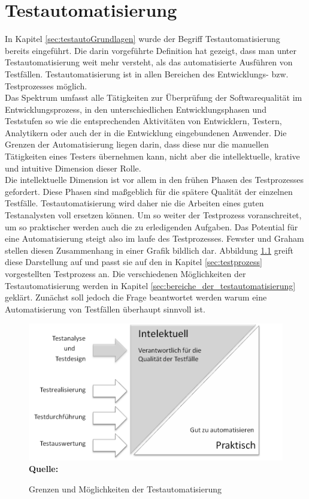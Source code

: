 \chapter{Testautomatisierung}
\label{sec:testautomatisierung}
In Kapitel \ref{sec:testautoGrundlagen} wurde der Begriff Testautomatisierung bereits eingeführt. Die darin vorgeführte Definition hat gezeigt, dass man unter Testautomatisierung weit mehr versteht, als das automatisierte Ausführen von Testfällen.
Testautomatisierung ist in allen Bereichen des Entwicklungs- bzw. Testprozesses möglich.\\
\glqq Das Spektrum umfasst alle Tätigkeiten zur Überprüfung der Softwarequalität im Entwicklungsprozess, in den unterschiedlichen Entwicklungsphasen und Teststufen so wie die entsprechenden Aktivitäten von Entwicklern, Testern, Analytikern oder auch der in die Entwicklung eingebundenen Anwender. Die Grenzen der Automatisierung liegen darin, dass diese nur die manuellen Tätigkeiten eines Testers übernehmen kann, nicht aber die intellektuelle, krative und intuitive Dimension dieser Rolle.\grqq\ \cite[S.7]{seidl_basiswissen_2012} \\
Die intellektuelle Dimension ist vor allem in den frühen Phasen des Testprozesses gefordert. Diese Phasen sind maßgeblich für die spätere Qualität der einzelnen Testfälle. Testautomatisierung wird daher nie die Arbeiten eines guten Testanalysten voll ersetzen können. Um so weiter der Testprozess voranschreitet, um so praktischer werden auch die zu erledigenden Aufgaben. Das Potential für eine Automatisierung steigt also im laufe des Testprozesses.
Fewster und Graham \cite[vgl. S.18]{fewster_software_1999} stellen diesen Zusammenhang in einer Grafik bildlich dar.  Abbildung \ref{fig:intellektuellVsPraktisch} greift diese Darstellung auf und passt sie auf den in Kapitel \ref{sec:testprozess} vorgestellten Testprozess an. Die verschiedenen Möglichkeiten der Testautomatisierung werden in Kapitel \ref{sec:bereiche_der_testautomatisierung} geklärt. Zunächst soll jedoch die Frage beantwortet werden warum eine Automatisierung von Testfällen überhaupt sinnvoll ist.

\begin{figure}[htb]
  \centering  
  \includegraphics[scale=1]{img/intelektuellVsPraktisch.png}\\
  \footnotesize\sffamily\textbf{Quelle:} \cite[vgl. S.18]{fewster_software_1999}
  \caption{Grenzen und Möglichkeiten der Testautomatisierung}
  \label{fig:intellektuellVsPraktisch}
\end{figure}

